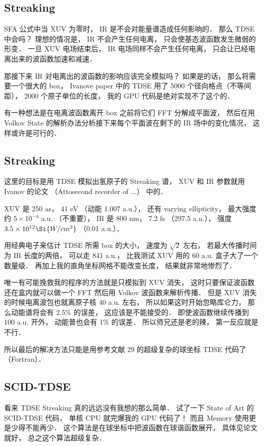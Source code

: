 \subsection{Streaking}
SFA 公式中当 XUV 为零时， IR 是不会对能量谱造成任何影响的． 那么 TDSE 中会吗？ 理想的情况是， IR 不会产生任何电离， 只会使基态波函数发生微弱的形变． 一旦 XUV 电场结束后， IR 电场同样不会产生任何电离， 只会让已经电离出来的波函数加速和减速．

那接下来 IR 对电离出的波函数的影响应该完全模拟吗？ 如果是的话， 那么将需要一个很大的 box， Ivanove paper 中的 TDSE 用了 5000 个径向格点（不等间距）， 2000 个原子单位的长度， 我的 GPU 代码是绝对实现不了这个的．

有一种想法是在电离波函数离开 box 之前将它们 FFT 分解成平面波， 然后在用 Volkov State 的解析办法分析接下来每个平面波在剩下的 IR 场中的变化情况， 这样或许是可行的．


\subsection{Streaking}
这里的目标是用 TDSE 模拟出氢原子的 Streaking 谱， XUV 和 IR 参数就用 Ivanov 的论文 （Attosecond recorder of ...） 中的．

XUV 是 250 as， 41 eV （动能 1.007 a.u.）， 还有 varying ellipticity， 最大强度约 $5\times 10^{-4}$ a.u. （不重要）， IR 是 800 nm， 7.2 fs （297.5 a.u.）， 强度 $3.5\times 10^{12} \Si{W/cm^2}$ （0.01 a.u.）．

用经典电子来估计 TDSE 所需 box 的大小， 速度为 $\sqrt{2}$ 左右， 若最大传播时间为 IR 长度的两倍， 可以走 841 a.u.， 比我测试 XUV 用的 60 a.u. 盒子大了一个数量级． 再加上我的直角坐标网格不能改变长度， 结果就非常地惨烈了．

唯一有可能挽救我的程序的方法就是只模拟到 XUV 消失， 这时只要保证波函数还在盒内就可以做一个 FFT 然后用 Volkov 波函数来解析传播． 但是 XUV 消失的时候电离波包也就离原子核 40 a.u. 左右， 所以如果这时开始忽略库仑力， 那么动能谱将会有 2.5\% 的误差， 这应该是不能接受的． 即使波函数继续传播到 100 a.u. 开外， 动能普也会有 1\% 的误差． 所以师兄还是老的辣， 第一反应就是不行．

所以最后的解决方法只能是用参考文献 29 的超级复杂的球坐标 TDSE 代码了（Fortran）．

\subsection{SCID-TDSE}
看来 TDSE Streaking 真的远远没有我想的那么简单． 试了一下 State of Art 的 SCID-TDSE 代码， 单核 CPU 就完爆我的 GPU 代码了！ 而且 Memory 使用更是少得不能再少． 这个算法是在球坐标中把波函数在球谐函数展开， 具体见论文就好， 总之这个算法超级复杂．


